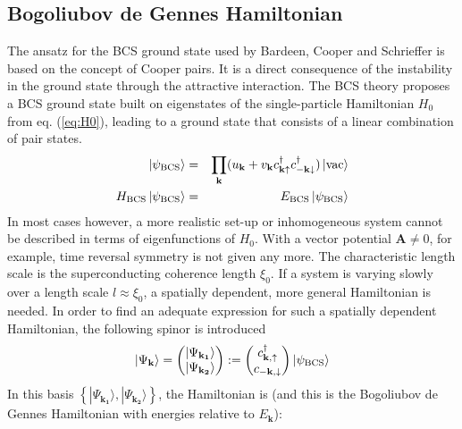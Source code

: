 \subsection*{Bogoliubov de Gennes Hamiltonian}
The ansatz for the BCS ground state used by Bardeen, Cooper and Schrieffer is based on the concept of Cooper pairs. It is a direct consequence of the instability in the ground state through the attractive interaction. The BCS theory proposes a BCS ground state built on eigenstates of the single-particle Hamiltonian $H_0$ from eq. (\ref{eq:H0}), leading to a ground state that consists of a linear combination of pair states. %
\begin{eqnarray}
\ket{\psi_\text{BCS}} &=& \prod_{ \mathbf{k} } (u_\mathbf{k} + v_\mathbf{k} c^{\dagger}_{ \mathbf{k} \uparrow } c^{\dagger}_{ - \mathbf{k} \downarrow }) \ket{\text{vac}} \\
H_\text{BCS} \ket{\psi_\text{BCS}} &=& E_\text{BCS} \ket{\psi_\text{BCS}}  
\end{eqnarray}
In most cases however, a more realistic set-up or inhomogeneous system cannot be described in terms of eigenfunctions of $H_0$. With a vector potential $\mathbf{A} \neq 0$, for example, time reversal symmetry is not given any more. %
The characteristic length scale is the superconducting coherence length $\xi_0$. If a system is varying slowly over a length scale $l \approx \xi_0$, a spatially dependent, more general Hamiltonian is needed. 
In order to find an adequate expression for such a spatially dependent Hamiltonian, the following spinor is introduced
\begin{equation}
\ket{\Psi_\mathbf{k}} = \begin{pmatrix}
| \Psi_\mathbf{k_1} \rangle \\ | \Psi_\mathbf{k_2} \rangle
\end{pmatrix} := \begin{pmatrix}
c^{\dagger}_{\mathbf{k}, \uparrow} \\ c_{- \mathbf{k}, \downarrow}
\end{pmatrix} \ket{\psi_\text{BCS}} \label{eq:spinor}
\end{equation}
In this basis $\left\{| \Psi_\mathbf{k_1} \rangle, | \Psi_\mathbf{k_2} \rangle \right\}$, the Hamiltonian is (and this is the Bogoliubov de Gennes Hamiltonian with energies relative to $E_\mathbf{k}$):
